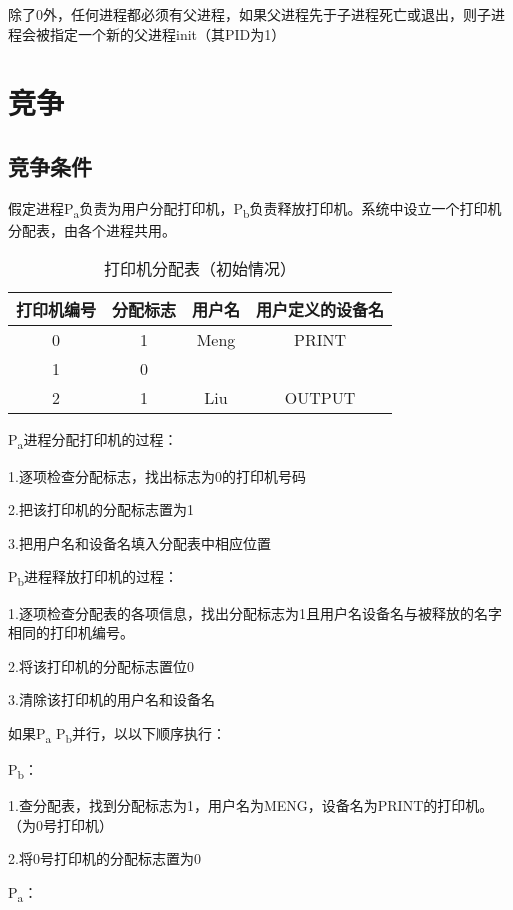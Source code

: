 \documentclass{ctexart}
\begin{document}
除了0外，任何进程都必须有父进程，如果父进程先于子进程死亡或退出，则子进程会被指定一个新的父进程init（其PID为1）
\clearpage
\section{竞争}
\subsection{竞争条件}
假定进程P\textsubscript{a}负责为用户分配打印机，P\textsubscript{b}负责释放打印机。系统中设立一个打印机分配表，由各个进程共用。
\begin{table}[h]  %
    \centering     %
    \caption{打印机分配表（初始情况）}  %
    \begin{tabular}{|c|c|c|c|}  %
        \hline
        \textbf{打印机编号} & \textbf{分配标志} & \textbf{用户名} & \textbf{用户定义的设备名} \\  %
        \hline
        0 & 1 & Meng & PRINT \\  %
        \hline
        1 & 0 &  &\\
        \hline
        2 & 1 & Liu & OUTPUT \\
        \hline
    \end{tabular}
\end{table}



P\textsubscript{a}进程分配打印机的过程：

1.逐项检查分配标志，找出标志为0的打印机号码

2.把该打印机的分配标志置为1

3.把用户名和设备名填入分配表中相应位置

P\textsubscript{b}进程释放打印机的过程：

1.逐项检查分配表的各项信息，找出分配标志为1且用户名设备名与被释放的名字相同的打印机编号。

2.将该打印机的分配标志置位0

3.清除该打印机的用户名和设备名

如果P\textsubscript{a} P\textsubscript{b}并行，以以下顺序执行：

P\textsubscript{b}：

1.查分配表，找到分配标志为1，用户名为MENG，设备名为PRINT的打印机。（为0号打印机）

2.将0号打印机的分配标志置为0

P\textsubscript{a}：
\end{document}
